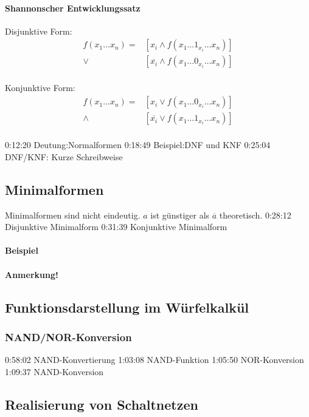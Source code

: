 \documentclass[a4paper]{scrartcl}
\begin{document}
			\paragraph{Shannonscher Entwicklungssatz}
			Disjunktive Form:
			\begin{align*}
				f(x_1 \dots x_n) = & [ x_i \wedge f(x_1 \dots 1_{x_i}  \dots x_n)]\\
											\vee & [\overline{x_i} \wedge f(x_1 \dots 0_{x_i} \dots x_n ) ]\\
			\end{align*}
			
			Konjunktive Form:
			\begin{align*}
				f(x_1 \dots x_n) = & [ x_i \vee f(x_1 \dots 0_{x_i}  \dots x_n)]\\
				\wedge & [\overline{x_i} \vee f(x_1 \dots 1_{x_i} \dots x_n ) ]\\
			\end{align*}
			 
			0:12:20 Deutung:Normalformen 
			0:18:49 Beispiel:DNF und KNF 
			0:25:04 DNF/KNF: Kurze Schreibweise 
			\subsection{Minimalformen} 
			Minimalformen sind nicht eindeutig. \( a \) ist günstiger als \( \overline{a} \) theoretisch.
			0:28:12 Disjunktive Minimalform 
			0:31:39 Konjunktive Minimalform
			 \paragraph{Beispiel}
			 \paragraph{Anmerkung!}
			 \subsection{Funktionsdarstellung im Würfelkalkül}
			 
			 
			\subsubsection{NAND/NOR-Konversion}
			0:58:02 NAND-Konvertierung 
			1:03:08 NAND-Funktion 
			1:05:50 NOR-Konversion 
			1:09:37 NAND-Konversion \\
			
			
		\subsection{Realisierung von Schaltnetzen}
\end{document}
